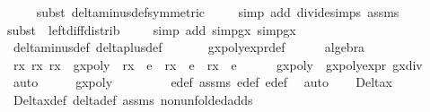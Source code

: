 \begin{isabellebody}
\ \ \ \ \isamarkupfalse%
{\isacharparenleft}subst\ delta{\isacharunderscore}minus{\isacharunderscore}def{\isacharbrackleft}symmetric{\isacharbrackright}{\isacharparenright}{\isacharplus}\isanewline
\ \ \ \ \isamarkupfalse%
{\isacharparenleft}simp\ add{\isacharcolon}\ divide{\isacharunderscore}simps\ assms{\isacharparenleft}{}{\isacharcomma}{}{}{\isacharparenright}{\isacharparenright}\isanewline
\ \ \ \ \isamarkupfalse%
{\isacharparenleft}subst\ {\isacharparenleft}{}{\isacharparenright}\ left{\isacharunderscore}diff{\isacharunderscore}distrib{\isacharparenright}\isanewline
\ \ \ \ \isamarkupfalse%
{\isacharparenleft}simp\ add{\isacharcolon}\ simp{}gx\ simp{}gx{\isacharparenright}\isanewline
\ \ \ \ \isamarkupfalse%
\ delta{\isacharunderscore}minus{\isacharunderscore}def\ delta{\isacharunderscore}plus{\isacharunderscore}def\ \isanewline
\ \ \ \ \isamarkupfalse%
\ gxpoly{\isacharunderscore}expr{\isacharunderscore}def\isanewline
\ \ \ \ \isamarkupfalse%
\ algebra\isanewline
\isanewline
\ \ \isamarkupfalse%
\ r{}x\ r{}x\ r{}x\ \ {\isachardoublequoteopen}gxpoly\ {\isacharequal}\ r{}x\ {\isacharasterisk}\ e{}\ {\isacharplus}\ r{}x\ {\isacharasterisk}\ e{}\ {\isacharplus}\ r{}x\ {\isacharasterisk}\ e{}{\isachardoublequoteclose}\isanewline
\ \ \ \ \isamarkupfalse%
\ {\isacartoucheopen}gxpoly\ {\isacharequal}\ gxpoly{\isacharunderscore}expr{\isacartoucheclose}\ gx{\isacharunderscore}div\ \isamarkupfalse%
\ auto\isanewline
\ \ \isamarkupfalse%
\ \isamarkupfalse%
\ {\isachardoublequoteopen}gxpoly\ {\isacharequal}\ {}{\isachardoublequoteclose}\ \isanewline
\ \ \ \ \isamarkupfalse%
\ e{}{\isacharunderscore}def\ assms{\isacharparenleft}{}{}{\isacharminus}{}{}{\isacharparenright}\ e{}{\isacharunderscore}def\ e{}{\isacharunderscore}def\ \isamarkupfalse%
\ auto\isanewline
\ \ \isamarkupfalse%
\ {\isachardoublequoteopen}Delta\isactrlsub x\ {\isasymnoteq}\ {}{\isachardoublequoteclose}\ \isanewline
\ \ \ \ \isamarkupfalse%
\ Delta\isactrlsub x{\isacharunderscore}def\ delta{\isacharunderscore}def\ assms{\isacharparenleft}{}{\isacharminus}{}{}{\isacharparenright}\ non{\isacharunderscore}unfolded{\isacharunderscore}adds\ \isamarkupfalse%

\end{isabellebody}
